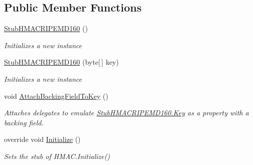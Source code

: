 \subsection*{Public Member Functions}
\begin{DoxyCompactItemize}
\item 
\hyperlink{class_system_1_1_security_1_1_cryptography_1_1_fakes_1_1_stub_h_m_a_c_r_i_p_e_m_d160_aa7997eeb2094976a6d775aad00febbd6}{Stub\-H\-M\-A\-C\-R\-I\-P\-E\-M\-D160} ()
\begin{DoxyCompactList}\small\item\em Initializes a new instance\end{DoxyCompactList}\item 
\hyperlink{class_system_1_1_security_1_1_cryptography_1_1_fakes_1_1_stub_h_m_a_c_r_i_p_e_m_d160_a6cb412012ce821d78abf5eac23311516}{Stub\-H\-M\-A\-C\-R\-I\-P\-E\-M\-D160} (byte\mbox{[}$\,$\mbox{]} key)
\begin{DoxyCompactList}\small\item\em Initializes a new instance\end{DoxyCompactList}\item 
void \hyperlink{class_system_1_1_security_1_1_cryptography_1_1_fakes_1_1_stub_h_m_a_c_r_i_p_e_m_d160_a61f215af0b83a0e201c45e7403e96754}{Attach\-Backing\-Field\-To\-Key} ()
\begin{DoxyCompactList}\small\item\em Attaches delegates to emulate \hyperlink{class_system_1_1_security_1_1_cryptography_1_1_fakes_1_1_stub_h_m_a_c_r_i_p_e_m_d160_a1abe6ecb223cf979de88101c02a192b9}{Stub\-H\-M\-A\-C\-R\-I\-P\-E\-M\-D160.\-Key} as a property with a backing field.\end{DoxyCompactList}\item 
override void \hyperlink{class_system_1_1_security_1_1_cryptography_1_1_fakes_1_1_stub_h_m_a_c_r_i_p_e_m_d160_a8eecec96d36fbb88a4e2639d7edc3fbc}{Initialize} ()
\begin{DoxyCompactList}\small\item\em Sets the stub of H\-M\-A\-C.\-Initialize()\end{DoxyCompactList}\end{DoxyCompactItemize}
